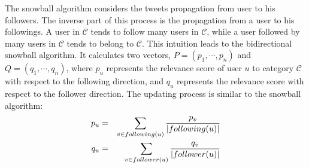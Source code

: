 \documentclass{article}
\begin{document}

The snowball algorithm considers the tweets propagation from user to his followers. The inverse part of this process is the propagation from a user to his followings. A user in $\mathcal{C}$ tends to follow many users in $\mathcal{C}$, while a user followed by many users in $\mathcal{C}$ tends to belong to $\mathcal{C}$. This intuition leads to the bidirectional snowball algorithm. It calculates two vectors, $P = (p_1, \cdots, p_n)$ and $Q = (q_1, \cdots, q_n)$, where $p_u$ represents the relevance score of user $u$ to category $\mathcal{C}$ with respect to the following direction, and $q_u$ represents the relevance score with respect to the follower direction. The updating process is similar to the snowball algorithm:
\begin{eqnarray}\label{eq:bidsnowball}
p_u & = & \sum_{v \in following(u)} \frac{p_v}{|following(u)|} \nonumber \\
q_u & = & \sum_{v \in follower(u)} \frac{q_v}{|follower(u)|}
\end{eqnarray}


\end{document}

